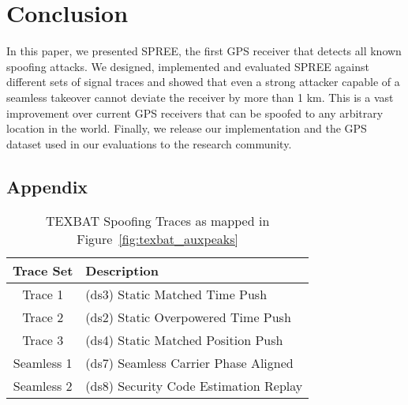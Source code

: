 \documentclass[letterpaper,twocolumn,10pt]{article}
\newcommand{\rxname}{SPREE\xspace}
\begin{document}
\section{Conclusion}
\label{sec:gps_conclusion}
In this paper, we presented \rxname, the first GPS receiver that detects all known spoofing attacks. We designed, implemented and evaluated \rxname against different sets of signal traces and showed that even a strong attacker capable of a seamless takeover cannot deviate the receiver by more than 1 km. This is a vast improvement over current GPS receivers that can be spoofed to any arbitrary location in the world. Finally, we release our implementation and the GPS dataset used in our evaluations to the research community. 



\subsection*{Appendix}
\begin{table}[h]
\centering
\begin{tabular}{|c|l|}
\hline
 \textbf{Trace Set} & \textbf{Description}\\ \hline
 Trace 1 & (ds3) Static Matched Time Push\\
 Trace 2 & (ds2) Static Overpowered Time Push\\
 Trace 3 & (ds4) Static Matched Position Push\\
 Seamless 1 & (ds7) Seamless Carrier Phase Aligned\\
 Seamless 2 & (ds8) Security Code Estimation Replay \\
 \hline
\end{tabular}
\caption{TEXBAT Spoofing Traces as mapped in Figure~\ref{fig:texbat_auxpeaks}}
\label{tab:vsd_results}
\end{table}
\end{document}
